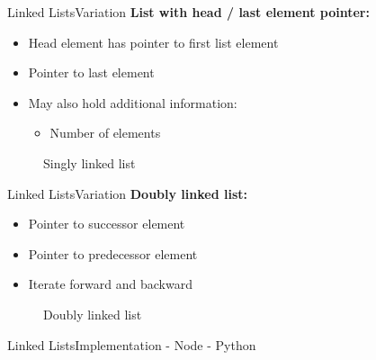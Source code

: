 \begin{frame}{Linked Lists}{Variation}
  \textbf{List with head / last element pointer:}
  \begin{itemize}
    \item
      Head element has pointer to first list element
    \item
      Pointer to last element
    \item
      May also hold additional information:
      \begin{itemize}
        \item
          Number of elements
      \end{itemize}
  \end{itemize}
  \begin{figure}
    
    \caption{Singly linked list}
    \label{fig:linked_list:variation:singly_linked_list_with_head}
  \end{figure}
\end{frame}


\begin{frame}{Linked Lists}{Variation}
  \textbf{Doubly linked list:}
  \begin{itemize}
    \item
      Pointer to successor element
    \item
      Pointer to predecessor element
    \item
      Iterate forward and backward
  \end{itemize}
  \begin{figure}
    
    \caption{Doubly linked list}
    \label{fig:linked_list:variation:doubly_linked_list}
  \end{figure}
\end{frame}


\begin{frame}[fragile]{Linked Lists}{Implementation - Node - Python}
  
\end{frame}

